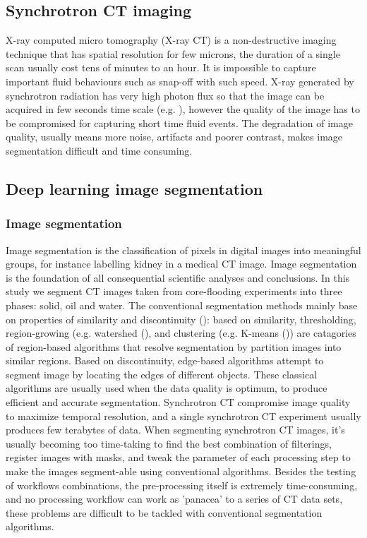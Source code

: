 \documentclass[draft,linenumbers]{agujournal2018}
\begin{document}
\subsection{Synchrotron CT imaging}
X-ray computed micro tomography (X-ray \textmu CT) is a non-destructive imaging technique that has spatial resolution for few microns, the duration of a single scan usually cost tens of minutes to an hour. It is impossible to capture important fluid behaviours such as snap-off with such speed. X-ray generated by synchrotron radiation has very high photon flux so that the image can be acquired in few seconds time scale (e.g. \citet{berg2014multiphase}), however the quality of the image has to be compromised for capturing short time fluid events. The degradation of image quality, usually means more noise, artifacts and poorer contrast, makes image segmentation difficult and time consuming.

\subsection{Deep learning image segmentation}
\subsubsection{Image segmentation}
Image segmentation is the classification of pixels in digital images into meaningful groups, for instance labelling kidney in a medical CT image. Image segmentation is the foundation of all consequential scientific analyses and conclusions. In this study we segment CT images taken from core-flooding experiments into three phases: solid, oil and water. The conventional segmentation methods mainly base on properties of similarity and discontinuity (\citet{gonzalez2002digital}): based on similarity, thresholding, region-growing (e.g. watershed (\citet{vincent1991watersheds}), and clustering (e.g. K-means (\citet{hartigan1979algorithm})) are catagories of region-based algorithms that resolve segmentation by partition images into similar regions. Based on discontinuity, edge-based algorithms attempt to segment image by locating the edges of different objects. These classical algorithms are usually used when the data quality is optimum, to produce efficient and accurate segmentation. Synchrotron \textmu CT compromise image quality to maximize temporal resolution, and a single synchrotron \textmu CT experiment usually produces few terabytes of data. When segmenting synchrotron \textmu CT images, it's usually becoming too time-taking to find the best combination of filterings, register images with masks, and tweak the parameter of each processing step to make the images segment-able using conventional algorithms. Besides the testing of workflows combinations, the pre-processing itself is extremely time-consuming, and no processing workflow can work as 'panacea' to a series of \textmu CT data sets, these problems are difficult to be tackled with conventional segmentation algorithms.
\end{document}
